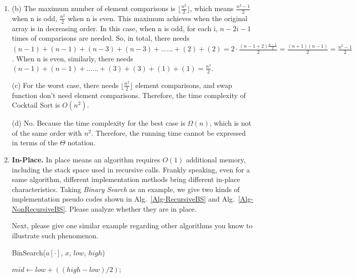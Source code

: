 \documentclass[12pt,a4paper]{article}
\makeatletter
\newtheorem*{solution}{Solution}
\newtheorem{definition}{Definition}
\theoremstyle{definition}
\renewenvironment{solution}[1][Solution] {\par\pushQED{\qed}\normalfont\topsep6\p@\@plus6\p@\relax\trivlist\item[\hskip\labelsep\bfseries#1\@addpunct{.}]\ignorespaces}{\popQED\endtrivlist\@endpefalse} \makeatother
\makeatother
\begin{document}
\begin{enumerate}
\begin{solution}
	(b) The maximum number of element comparisons is $\lfloor \frac{n^2}{2}\rfloor$, which means $\frac{n^2-1}{2}$ when n is odd, $\frac{n^2}{2}$ when n is even. This maximum achieves when the original array is in decreasing order. In this case, when n is odd, for each i, $n-2i-1$ times of comparisons are needed. So, in total, there needs $(n-1) + (n-1) + (n-3) + (n-3) + ...... + (2) + (2) = 2\cdot \frac{(n-1+2)\frac{n-1}{2}}{2} = \frac{(n+1)(n-1)}{2} = \frac{n^2-1}{2}$.  When n is even, similarly, there needs $(n-1) + (n-1) + ...... + (3) + (3) + (1) + (1) = \frac{n^2}{2}.$
	
	(c) For the worst case, there needs $\lfloor \frac{n^2}{2}\rfloor$ element comparisons, and swap function don't need element comparisons. Therefore, the time complexity of Cocktail Sort is $O(n^2)$.
	
	(d) No. Because the time complexity for the best case is $\Omega(n)$, which is not of the same order with $n^2$. Therefore, the running time cannot be expressed in terms of the $\Theta$ notation.
\end{solution}


\newpage

\item \textbf{In-Place.} In place means an algorithm requires $O(1)$ additional memory, including the stack space used in recursive calls. Frankly speaking, even for a same algorithm, different implementation methods bring different in-place characteristics. Taking \emph{Binary Search} as an example, we give two kinds of implementation pseudo codes shown in Alg.~\ref{Alg-RecursiveBS} and Alg.~\ref{Alg-NonRecursiveBS}. Please analyze whether they are in place.
    
    Next, please give one similar example regarding other algorithms you know to illustrate such phenomenon.

%

\begin{minipage}[t]{0.49\textwidth}
\begin{algorithm}[H]
	\BlankLine
	\caption{BinSearch($a[\cdot]$, $x$, $low$, $high$)} \label{Alg-RecursiveBS}
	\BlankLine
    $mid \leftarrow low +((high - low) / 2)$;
    

\end{algorithm}
\end{minipage}
\end{enumerate}
\end{document}
